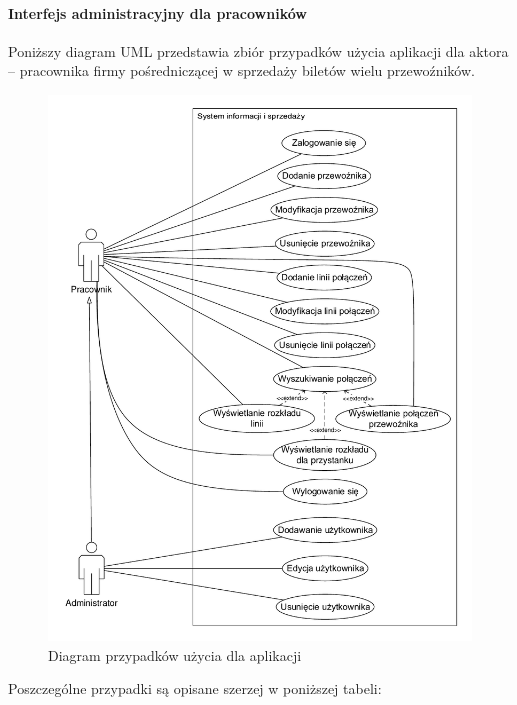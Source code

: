 \documentclass[10pt,a4paper]{article}
\begin{document}
\paragraph{Interfejs administracyjny dla pracowników}
Poniższy diagram UML przedstawia zbiór przypadków użycia aplikacji dla aktora -- pracownika firmy pośredniczącej w sprzedaży biletów wielu przewoźników.
\begin{figure}[H]
	\centering
	\includegraphics[width=12cm]{use-case.pdf}
	\caption{Diagram przypadków użycia dla aplikacji}
\end{figure}
Poszczególne przypadki są opisane szerzej w poniższej tabeli:
\end{document}
